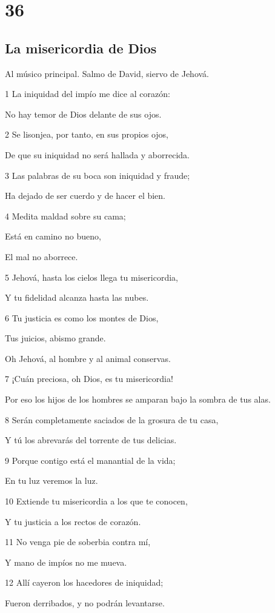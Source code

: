 \chapter{36}

\section*{La misericordia de Dios}

\par Al músico principal. Salmo de David, siervo de Jehová.

\par 1 La iniquidad del impío me dice al corazón:
\par No hay temor de Dios delante de sus ojos.
\par 2 Se lisonjea, por tanto, en sus propios ojos,
\par De que su iniquidad no será hallada y aborrecida.
\par 3 Las palabras de su boca son iniquidad y fraude;
\par Ha dejado de ser cuerdo y de hacer el bien.
\par 4 Medita maldad sobre su cama;
\par Está en camino no bueno,
\par El mal no aborrece.
\par 5 Jehová, hasta los cielos llega tu misericordia,
\par Y tu fidelidad alcanza hasta las nubes.
\par 6 Tu justicia es como los montes de Dios,
\par Tus juicios, abismo grande.
\par Oh Jehová, al hombre y al animal conservas.
\par 7 ¡Cuán preciosa, oh Dios, es tu misericordia!
\par Por eso los hijos de los hombres se amparan bajo la sombra de tus alas.
\par 8 Serán completamente saciados de la grosura de tu casa,
\par Y tú los abrevarás del torrente de tus delicias.
\par 9 Porque contigo está el manantial de la vida;
\par En tu luz veremos la luz.
\par 10 Extiende tu misericordia a los que te conocen,
\par Y tu justicia a los rectos de corazón.
\par 11 No venga pie de soberbia contra mí,
\par Y mano de impíos no me mueva.
\par 12 Allí cayeron los hacedores de iniquidad;
\par Fueron derribados, y no podrán levantarse.

